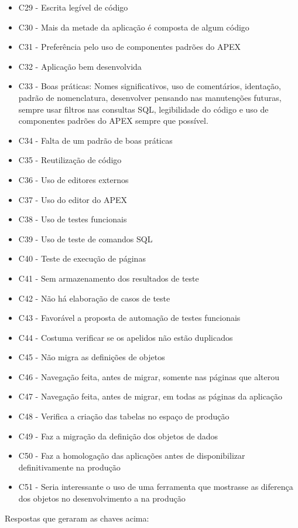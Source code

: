 \begin{itemize}
\item C29 - Escrita legível de código
\item C30 - Mais da metade da aplicação é composta de algum código
\item C31 - Preferência pelo uso de componentes padrões do APEX
\item C32 - Aplicação bem desenvolvida
\item C33 - Boas práticas: Nomes significativos, uso de comentários, identação, padrão de nomenclatura, desenvolver pensando nas manutenções futuras, sempre usar filtros nas consultas SQL, legibilidade do código e uso de componentes padrões do APEX sempre que possível.
\item C34 - Falta de um padrão de boas práticas
\item C35 - Reutilização de código
\item C36 - Uso de editores externos
\item C37 - Uso do editor do APEX
\item C38 - Uso de testes funcionais
\item C39 - Uso de teste de comandos SQL
\item C40 - Teste de execução de páginas
\item C41 - Sem armazenamento dos resultados de teste
\item C42 - Não há elaboração de casos de teste
\item C43 - Favorável a proposta de automação de testes funcionais
\item C44 - Costuma verificar se os apelidos não estão duplicados
\item C45 - Não migra as definições de objetos
\item C46 - Navegação feita, antes de migrar, somente nas páginas que alterou
\item C47 - Navegação feita, antes de migrar, em todas as páginas da aplicação
\item C48 - Verifica a criação das tabelas no espaço de produção
\item C49 - Faz a migração da definição dos objetos de dados
\item C50 - Faz a homologação das aplicações antes de disponibilizar definitivamente na produção
\item C51 - Seria interessante o uso de uma ferramenta que mostrasse as diferença dos objetos no desenvolvimento a na produção\newline\newline
\end{itemize} Respostas que geraram as chaves acima:\newline

